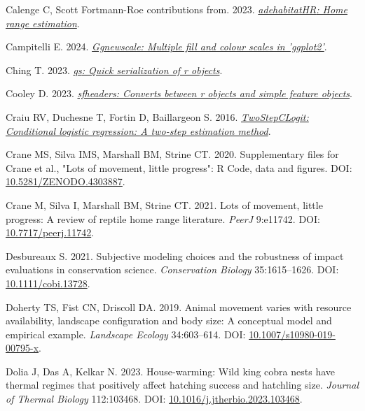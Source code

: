 \documentclass[10pt,a4paper]{article}
\newlength{\cslhangindent}
\newenvironment{CSLReferences}[2] %
 {\begin{list}{}{%
  \setlength{\itemindent}{0pt}
  \setlength{\leftmargin}{0pt}
  \setlength{\parsep}{0pt}
  \ifodd #1
   \setlength{\leftmargin}{\cslhangindent}
   \setlength{\itemindent}{-1\cslhangindent}
  \fi
  \setlength{\itemsep}{#2\baselineskip}}}
 {\end{list}}
\begin{document}
\begin{CSLReferences}{1}{0}
Calenge C, Scott Fortmann-Roe contributions from. 2023. \emph{\href{https://CRAN.R-project.org/package=adehabitatHR}{{adehabitatHR}: Home range estimation}}.

Campitelli E. 2024. \emph{\href{https://CRAN.R-project.org/package=ggnewscale}{Ggnewscale: Multiple fill and colour scales in 'ggplot2'}}.

Ching T. 2023. \emph{\href{https://CRAN.R-project.org/package=qs}{{qs}: Quick serialization of r objects}}.

Cooley D. 2023. \emph{\href{https://CRAN.R-project.org/package=sfheaders}{{sfheaders}: Converts between r objects and simple feature objects}}.

Craiu RV, Duchesne T, Fortin D, Baillargeon S. 2016. \emph{\href{https://CRAN.R-project.org/package=TwoStepCLogit}{TwoStepCLogit: Conditional logistic regression: A two-step estimation method}}.

Crane MS, Silva IMS, Marshall BM, Strine CT. 2020. Supplementary files for {Crane} et al., "{Lots} of movement, little progress": {R} {Code}, data and figures. DOI: \href{https://doi.org/10.5281/ZENODO.4303887}{10.5281/ZENODO.4303887}.

Crane M, Silva I, Marshall BM, Strine CT. 2021. Lots of movement, little progress: A review of reptile home range literature. \emph{PeerJ} 9:e11742. DOI: \href{https://doi.org/10.7717/peerj.11742}{10.7717/peerj.11742}.

Desbureaux S. 2021. Subjective modeling choices and the robustness of impact evaluations in conservation science. \emph{Conservation Biology} 35:1615--1626. DOI: \href{https://doi.org/10.1111/cobi.13728}{10.1111/cobi.13728}.

Doherty TS, Fist CN, Driscoll DA. 2019. Animal movement varies with resource availability, landscape configuration and body size: A conceptual model and empirical example. \emph{Landscape Ecology} 34:603--614. DOI: \href{https://doi.org/10.1007/s10980-019-00795-x}{10.1007/s10980-019-00795-x}.

Dolia J, Das A, Kelkar N. 2023. House-warming: {Wild} king cobra nests have thermal regimes that positively affect hatching success and hatchling size. \emph{Journal of Thermal Biology} 112:103468. DOI: \href{https://doi.org/10.1016/j.jtherbio.2023.103468}{10.1016/j.jtherbio.2023.103468}.


\end{CSLReferences}
\end{document}

